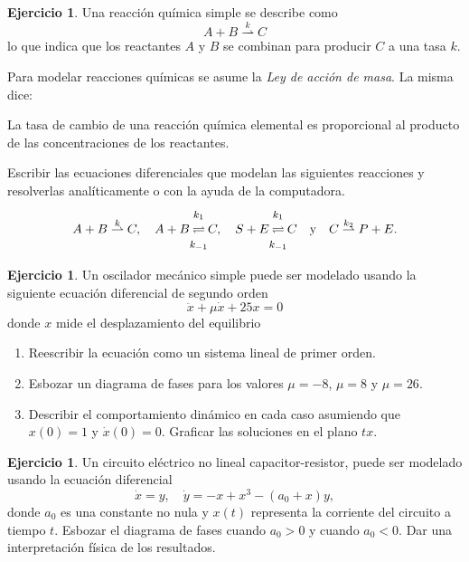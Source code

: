 \documentclass[12pt, a4paper]{amsbook}
\theoremstyle{remark}
\theoremstyle{definition}
\newtheorem{ejer}[teo]{Ejercicio}
\numberwithin{section}{chapter}
\numberwithin{subsection}{section}
\numberwithin{equation}{section}
\numberwithin{figure}{chapter}
\begin{document}
\begin{ejer} Una reacción química simple se describe como
$$
A + B \stackrel{k}{\rightharpoonup} C
$$
lo que indica que los reactantes $A$ y $B$ se combinan para producir $C$ a una tasa $k$.

Para modelar reacciones químicas se asume la {\em Ley de acción de masa}. La misma dice:

 La tasa de cambio de una reacción química elemental es proporcional al producto de las concentraciones de los reactantes.

Escribir las ecuaciones diferenciales que modelan las siguientes reacciones y resolverlas analíticamente o con la ayuda de la computadora.
$$
A + B \stackrel{k}{\rightharpoonup} C,\quad A + B \begin{matrix}\text{\footnotesize $k_1$}\\ \rightleftharpoons\\ \text{\footnotesize $k_{-1}$}\end{matrix} C,\quad S + E \begin{matrix}\text{\footnotesize $k_1$}\\ \rightleftharpoons\\ \text{\footnotesize $k_{-1}$}\end{matrix} C\quad \text{y}\quad C \stackrel{k_2}{\rightharpoonup}  P + E.
$$
\end{ejer}


\begin{ejer}
Un oscilador mecánico simple puede ser modelado usando la siguiente ecuación diferencial de segundo orden
$$
\ddot x + \mu \dot x + 25 x = 0
$$
donde $x$ mide el desplazamiento del equilibrio
\begin{enumerate}
\item Reescribir la ecuación como un sistema lineal de primer orden.
\item Esbozar un diagrama de fases para los valores $\mu=-8$, $\mu=8$ y $\mu=26$.
\item Describir el comportamiento dinámico en cada caso asumiendo que $x(0)=1$ y $\dot x(0)=0$. Graficar las soluciones en el plano $t x$.
\end{enumerate}
\end{ejer}

\begin{ejer}
Un circuito eléctrico no lineal capacitor-resistor, puede ser modelado usando la ecuación diferencial
$$
\dot x = y,\quad  \dot y = -x + x^3 - (a_0 + x)y,
$$
donde $a_0$ es una constante no nula y $x(t)$ representa la corriente del circuito a tiempo $t$. Esbozar el diagrama de fases cuando $a_0>0$ y cuando $a_0<0$. Dar una interpretación física de los resultados.
\end{ejer}
\end{document}
